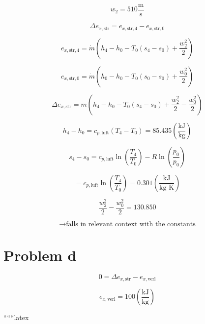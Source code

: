 \[
w_2 = 510 \frac{\text{m}}{\text{s}}
\]

\[
\Delta e_{x, \text{str}} = e_{x, \text{str}, 4} - e_{x, \text{str}, 0}
\]

\[
e_{x, \text{str}, 4} = \dot{m} \left( h_4 - h_0 - T_0 (s_4 - s_0) + \frac{w_2^2}{2} \right)
\]

\[
e_{x, \text{str}, 0} = \dot{m} \left( h_0 - h_0 - T_0 (s_0 - s_0) + \frac{w_0^2}{2} \right)
\]

\[
\Delta e_{x, \text{str}} = \dot{m} \left( h_4 - h_0 - T_0 (s_4 - s_0) + \frac{w_2^2}{2} - \frac{w_0^2}{2} \right)
\]

\[
h_4 - h_0 = c_{p, \text{luft}} (T_4 - T_0) = 85.435 \left( \frac{\text{kJ}}{\text{kg}} \right)
\]

\[
s_4 - s_0 = c_{p, \text{luft}} \ln \left( \frac{T_4}{T_0} \right) - R \ln \left( \frac{p_0}{p_0} \right)
\]

\[
= c_{p, \text{luft}} \ln \left( \frac{T_4}{T_0} \right) = 0.301 \left( \frac{\text{kJ}}{\text{kg K}} \right)
\]

\[
\frac{w_2^2}{2} - \frac{w_0^2}{2} = 130.850
\]

\[
\rightarrow \text{falls in relevant context with the constants}
\]

\section*{Problem d}

\[
0 = \Delta e_{x, \text{str}} - e_{x, \text{verl}}
\]

\[
e_{x, \text{verl}} = 100 \left( \frac{\text{kJ}}{\text{kg}} \right)
\]

``````latex



